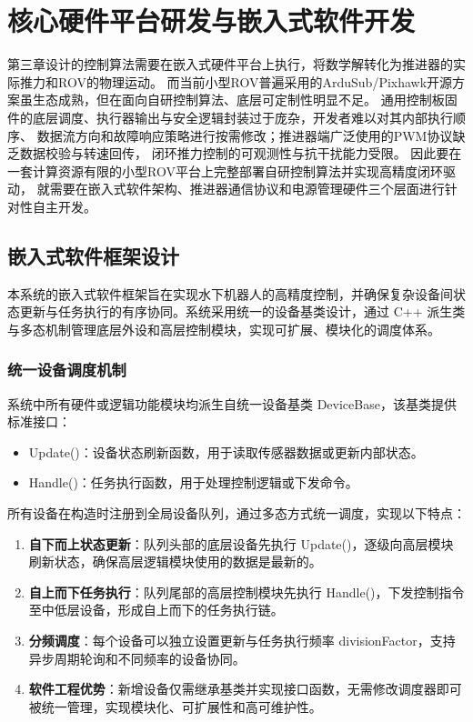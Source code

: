 
\chapter{核心硬件平台研发与嵌入式软件开发}

第三章设计的控制算法需要在嵌入式硬件平台上执行，将数学解转化为推进器的实际推力和ROV的物理运动。
而当前小型ROV普遍采用的ArduSub/Pixhawk开源方案虽生态成熟，但在面向自研控制算法、底层可定制性明显不足。
通用控制板固件的底层调度、执行器输出与安全逻辑封装过于庞杂，开发者难以对其内部执行顺序、
数据流方向和故障响应策略进行按需修改；推进器端广泛使用的PWM协议缺乏数据校验与转速回传，
闭环推力控制的可观测性与抗干扰能力受限。
因此要在一套计算资源有限的小型ROV平台上完整部署自研控制算法并实现高精度闭环驱动，
就需要在嵌入式软件架构、推进器通信协议和电源管理硬件三个层面进行针对性自主开发。


\section{嵌入式软件框架设计}

本系统的嵌入式软件框架旨在实现水下机器人的高精度控制，并确保复杂设备间状态更新与任务执行的有序协同。系统采用统一的设备基类设计，通过 C++ 派生类与多态机制管理底层外设和高层控制模块，实现可扩展、模块化的调度体系。

\subsection{统一设备调度机制}

系统中所有硬件或逻辑功能模块均派生自统一设备基类 DeviceBase，该基类提供标准接口：

\begin{itemize}
    \item Update()：设备状态刷新函数，用于读取传感器数据或更新内部状态。
    \item Handle()：任务执行函数，用于处理控制逻辑或下发命令。
\end{itemize}

所有设备在构造时注册到全局设备队列，通过多态方式统一调度，实现以下特点：

\begin{enumerate}[label=(\arabic*)]
    \item \textbf{自下而上状态更新}：队列头部的底层设备先执行 Update()，逐级向高层模块刷新状态，确保高层逻辑模块使用的数据是最新的。
    
    \item \textbf{自上而下任务执行}：队列尾部的高层控制模块先执行 Handle()，下发控制指令至中低层设备，形成自上而下的任务执行链。
    
    \item \textbf{分频调度}：每个设备可以独立设置更新与任务执行频率 divisionFactor，支持异步周期轮询和不同频率的设备协同。
    
    \item \textbf{软件工程优势}：新增设备仅需继承基类并实现接口函数，无需修改调度器即可被统一管理，实现模块化、可扩展性和高可维护性。
\end{enumerate}


